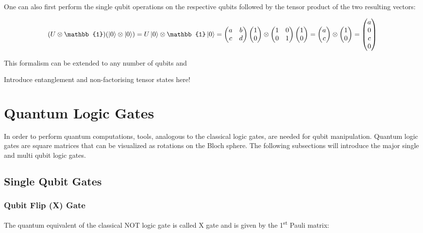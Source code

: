 One can also first perform the single qubit operations on the respective qubits followed by the tensor product of the two resulting vectors:

\begin{equation}
\label{equ:2qubitlineartransform2}
(U \otimes \mathbb{1})(\ket{0} \otimes \ket{0})= U\ket{0} \otimes \mathbb{1}\ket{0} = \begin{pmatrix}
 a & b \\ 
 c & d
 \end{pmatrix} \colvec{1\\0} \otimes \begin{pmatrix}
 1 & 0 \\ 
 0 & 1
 \end{pmatrix} \colvec{1\\0} = \colvec{a\\c} \otimes \colvec{1\\0} = \colvec{a\\0\\c\\0}
\end{equation}

This formalism can be extended to any number of qubits and 

Introduce entanglement and non-factorising tensor states here!



\section{Quantum Logic Gates}
\label{subsec:quantumlogicgates}
In order to perform quantum computations, tools, analogous to the classical logic gates, are needed for qubit manipulation. Quantum logic gates are square matrices that can be visualized as rotations on the Bloch sphere. The following subsections will introduce the major single and multi qubit logic gates.

\subsection{Single Qubit Gates}
\label{subsubsec:singlequbitgates} 

\subsubsection{Qubit Flip (X) Gate}
\label{subsubsubsec:xgate}

The quantum equivalent of the classical NOT logic gate is called X gate and is given by the 1\textsuperscript{st} Pauli matrix:

